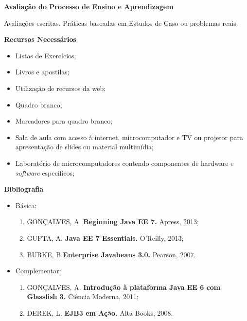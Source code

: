 \begin{snugshade}\begin{center}\textbf{
    Avaliação do Processo de Ensino e Aprendizagem
}\end{center}\end{snugshade}   

\noindent
  Avaliações escritas. Práticas baseadas em Estudos de Caso ou problemas reais.

\begin{snugshade}\begin{center}\textbf{
    Recursos Necessários
    \vphantom{q} %
}\end{center}\end{snugshade}

\begin{itemize} 
  \item Listas de Exercícios;
  \item Livros e apostilas;
  \item Utilização de recursos da web;
  \item Quadro branco;
  \item Marcadores para quadro branco;
  \item Sala de aula com acesso à internet, microcomputador e TV ou projetor para apresentação de slides ou material multimídia;
  \item Laboratório de microcomputadores contendo componentes de hardware e \textit{software} específicos;
\end{itemize}


\begin{snugshade}\begin{center}\textbf{
    Bibliografia
}\end{center}\end{snugshade}

\begin{itemize} 
  \item Básica:
	\begin{enumerate}
	\item 	GONÇALVES, A. \textbf{Beginning Java EE 7.} Apress, 2013;
	\item 	GUPTA, A. \textbf{Java EE 7 Essentials.} O’Reilly, 2013;
	\item 	BURKE, B.\textbf{Enterprise Javabeans 3.0.} Pearson, 2007. 
	\end{enumerate}
  \item Complementar:
	\begin{enumerate} 
	\item 	GONÇALVES, A. \textbf{Introdução à plataforma Java EE 6 com Glassfish 3.} Ciência Moderna, 2011;
	\item 	DEREK, L. \textbf{EJB3 em Ação.} Alta Books, 2008.
	\end{enumerate}
\end{itemize}
